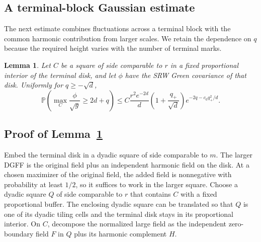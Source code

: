 \documentclass[11pt,letterpaper,reqno]{amsart}
\numberwithin{equation}{section}
\newtheorem{lemma}[theorem]{Lemma}
\theoremstyle{remark}
\begin{document}
\subsection{A terminal-block Gaussian estimate}\label{sec:terminalupper}
The next estimate combines fluctuations across a terminal block with the common harmonic contribution from larger scales. We retain the dependence on $q$ because the required height varies with the number of terminal marks.
\begin{lemma}\label{lem:terminalupper}
Let $C$ be a square of side comparable to $r$ in a fixed proportional interior of the terminal disk, and let $\phi$ have the SRW Green covariance of that disk. Uniformly for $q\ge-\sqrt d$,
\begin{equation}\label{eq:4.5}
\mathbb P\left(\max_C\frac{\phi}{\sqrt g}\ge2d+q\right)
\le C\frac{r^2e^{-2d}}d
\left(1+\frac{q_+}{\sqrt d}\right)e^{-2q-c_0q_+^2/d}.
\end{equation}
\end{lemma}

\subsection{Proof of Lemma~\ref{lem:terminalupper}}\label{sec:terminalupperproof}
Embed the terminal disk in a dyadic square of side comparable to $m$. The larger DGFF is the original field plus an independent harmonic field on the disk. At a chosen maximizer of the original field, the added field is nonnegative with probability at least $1/2$, so it suffices to work in the larger square. Choose a dyadic square $Q$ of side comparable to $r$ that contains $C$ with a fixed proportional buffer. The enclosing dyadic square can be translated so that $Q$ is one of its dyadic tiling cells and the terminal disk stays in its proportional interior. On $C$, decompose the normalized large field as the independent zero-boundary field $F$ in $Q$ plus its harmonic complement $H$.
\end{document}
